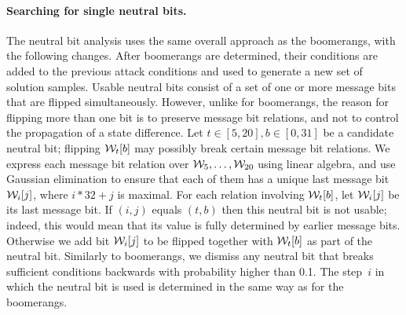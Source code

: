 \paragraph{Searching for single neutral bits.}
The neutral bit analysis uses the same overall approach as the boomerangs, with the following changes.
After boomerangs are determined, their conditions are added to the previous attack conditions and used to generate a new set of solution samples.
Usable neutral bits consist of a set of one or more message bits that are flipped simultaneously.
However, unlike for boomerangs, the reason for flipping more than one bit is to preserve message bit relations, and not to control the
propagation of a state difference.
Let $t\in[5,20], b\in[0,31]$ be a candidate neutral bit; flipping $\mathcal{W}_t[b]$ may possibly break certain message bit relations.
We express each message bit relation over $\mathcal{W}_5,\ldots,\mathcal{W}_{20}$ using linear algebra, 
and use Gaussian elimination to ensure that each of them has a unique last message bit $\mathcal{W}_i[j]$, \ie where $i*32+j$ is maximal.
For each relation involving $\mathcal{W}_t[b]$, let $\mathcal{W}_i[j]$ be its last message bit.
If $(i,j)$ equals $(t,b)$ then this neutral bit is not usable; indeed, this would mean that its value is fully determined by earlier message bits.
Otherwise we add bit $\mathcal{W}_i[j]$ to be flipped together with $\mathcal{W}_t[b]$ as part of the neutral bit.
Similarly to boomerangs, we dismiss any neutral bit that breaks sufficient conditions backwards with probability higher than 0.1.
The step~$i$ in which the neutral bit is used is determined in the same way as for the boomerangs.

